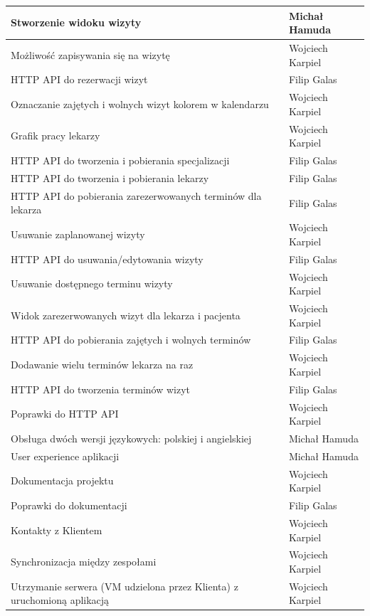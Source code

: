 \documentclass[polish,12pt]{aghthesis}
\begin{document}
\begin{center}
\begin{tabular}{ | l | l | }
    Stworzenie widoku wizyty & Michał Hamuda \\ \hline
    Możliwość zapisywania się na wizytę & Wojciech Karpiel \\ \hline
    HTTP API do rezerwacji wizyt & Filip Galas \\ \hline
    Oznaczanie zajętych i wolnych wizyt kolorem w kalendarzu & Wojciech Karpiel \\ \hline
    Grafik pracy lekarzy & Wojciech Karpiel \\ \hline
    HTTP API do tworzenia i pobierania specjalizacji & Filip Galas \\ \hline
    HTTP API do tworzenia i pobierania lekarzy & Filip Galas \\ \hline
    HTTP API do pobierania zarezerwowanych terminów dla lekarza & Filip Galas \\ \hline
    Usuwanie zaplanowanej wizyty & Wojciech Karpiel \\ \hline
    HTTP API do usuwania/edytowania wizyty & Filip Galas \\ \hline
    Usuwanie dostępnego terminu wizyty & Wojciech Karpiel \\ \hline
    Widok zarezerwowanych wizyt dla lekarza i pacjenta & Wojciech Karpiel \\ \hline
    HTTP API do pobierania zajętych i wolnych terminów & Filip Galas \\ \hline
    Dodawanie wielu terminów lekarza na raz & Wojciech Karpiel \\ \hline
    HTTP API do tworzenia terminów wizyt & Filip Galas \\ \hline
    Poprawki do HTTP API & Wojciech Karpiel \\ \hline
    Obsługa dwóch wersji językowych: polskiej i angielskiej & Michał Hamuda \\ \hline
    User experience aplikacji & Michał Hamuda \\ \hline
    Dokumentacja projektu & Wojciech Karpiel \\ \hline
    Poprawki do dokumentacji & Filip Galas \\ \hline
    Kontakty z Klientem & Wojciech Karpiel \\ \hline
    Synchronizacja między zespołami & Wojciech Karpiel \\ \hline
    Utrzymanie serwera (VM udzielona przez Klienta) z uruchomioną aplikacją & Wojciech Karpiel \\ \hline
  \end{tabular}
\end{center}
\end{document}
